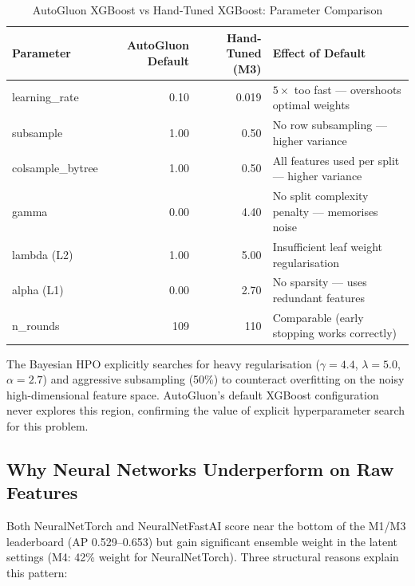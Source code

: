 \documentclass{report}\usepackage[]{graphicx}\usepackage[table]{xcolor}
\begin{document}
\begin{table}[H]
\centering
\caption{AutoGluon XGBoost vs Hand-Tuned XGBoost: Parameter Comparison}
\begin{tabular}{lrrl}
\toprule
\textbf{Parameter} & \textbf{AutoGluon Default} & \textbf{Hand-Tuned (M3)} & \textbf{Effect of Default} \\
\midrule
learning\_rate      & 0.10  & 0.019 & $5\times$ too fast — overshoots optimal weights \\
subsample           & 1.00  & 0.50  & No row subsampling — higher variance \\
colsample\_bytree   & 1.00  & 0.50  & All features used per split — higher variance \\
gamma               & 0.00  & 4.40  & No split complexity penalty — memorises noise \\
lambda (L2)         & 1.00  & 5.00  & Insufficient leaf weight regularisation \\
alpha (L1)          & 0.00  & 2.70  & No sparsity — uses redundant features \\
n\_rounds           & 109   & 110   & Comparable (early stopping works correctly) \\
\bottomrule
\end{tabular}
\end{table}

\noindent The Bayesian HPO explicitly searches for heavy regularisation
($\gamma=4.4$, $\lambda=5.0$, $\alpha=2.7$) and aggressive subsampling (50\%)
to counteract overfitting on the noisy high-dimensional feature space.
AutoGluon's default XGBoost configuration never explores this region,
confirming the value of explicit hyperparameter search for this problem.

\subsection{Why Neural Networks Underperform on Raw Features}

Both NeuralNetTorch and NeuralNetFastAI score near the bottom of the M1/M3
leaderboard (AP 0.529--0.653) but gain significant ensemble weight in the
latent settings (M4: 42\% weight for NeuralNetTorch). Three structural reasons
explain this pattern:
\end{document}
